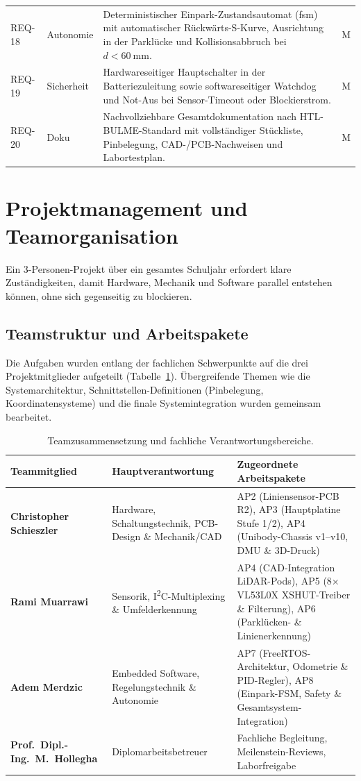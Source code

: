 \begin{longtable}{@{}p{1.5cm}p{2.3cm}p{8.8cm}c@{}}
REQ-18 & Autonomie & Deterministischer Einpark-Zustandsautomat (\gls{fsm}) mit automatischer Rückwärts-S-Kurve, Ausrichtung in der Parklücke und Kollisionsabbruch bei $d < \qty{60}{\milli\meter}$. & M \\
REQ-19 & Sicherheit & Hardwareseitiger Hauptschalter in der Batteriezuleitung sowie softwareseitiger Watchdog und Not-Aus bei Sensor-Timeout oder Blockierstrom. & M \\
REQ-20 & Doku & Nachvollziehbare Gesamtdokumentation nach HTL-BULME-Standard mit vollständiger Stückliste, Pinbelegung, CAD-/PCB-Nachweisen und Labortestplan. & M \\
\end{longtable}

\section{Projektmanagement und Teamorganisation}
\label{sec:projektmanagement}
Ein 3-Personen-Projekt über ein gesamtes Schuljahr erfordert klare Zuständigkeiten, damit Hardware, Mechanik und Software parallel entstehen können, ohne sich gegenseitig zu blockieren.

\subsection{Teamstruktur und Arbeitspakete}
Die Aufgaben wurden entlang der fachlichen Schwerpunkte auf die drei Projektmitglieder aufgeteilt (Tabelle~\ref{tab:team}). Übergreifende Themen wie die Systemarchitektur, Schnittstellen-Definitionen (Pinbelegung, Koordinatensysteme) und die finale Systemintegration wurden gemeinsam bearbeitet.

\begin{table}[htbp]
\centering
\caption{Teamzusammensetzung und fachliche Verantwortungsbereiche.}
\label{tab:team}
\begin{tabular}{@{}p{3.6cm}p{4.4cm}p{6.2cm}@{}}
\toprule
\textbf{Teammitglied} & \textbf{Hauptverantwortung} & \textbf{Zugeordnete Arbeitspakete} \\
\midrule
\textbf{Christopher Schieszler} & Hardware, Schaltungstechnik, PCB-Design \& Mechanik/CAD & AP2 (Liniensensor-PCB R2), AP3 (Hauptplatine Stufe 1/2), AP4 (Unibody-Chassis v1–v10, DMU \& 3D-Druck) \\
\textbf{Rami Muarrawi} & Sensorik, I\textsuperscript{2}C-Multiplexing \& Umfelderkennung & AP4 (CAD-Integration LiDAR-Pods), AP5 (8× VL53L0X XSHUT-Treiber \& Filterung), AP6 (Parklücken- \& Linienerkennung) \\
\textbf{Adem Merdzic} & Embedded Software, Regelungstechnik \& Autonomie & AP7 (FreeRTOS-Architektur, Odometrie \& PID-Regler), AP8 (Einpark-FSM, Safety \& Gesamtsystem-Integration) \\
\midrule
\textbf{Prof.~Dipl.-Ing.~M.~Hollegha} & Diplomarbeitsbetreuer & Fachliche Begleitung, Meilenstein-Reviews, Laborfreigabe \\
\bottomrule
\end{tabular}
\end{table}

